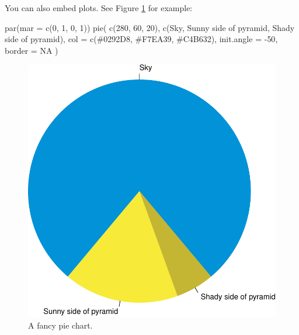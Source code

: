 \documentclass[
]{book}
\newenvironment{Shaded}{\begin{snugshade}}{\end{snugshade}}
\newcommand{\AttributeTok}[1]{\textcolor[rgb]{0.77,0.63,0.00}{#1}}
\newcommand{\ConstantTok}[1]{\textcolor[rgb]{0.00,0.00,0.00}{#1}}
\newcommand{\DecValTok}[1]{\textcolor[rgb]{0.00,0.00,0.81}{#1}}
\newcommand{\FunctionTok}[1]{\textcolor[rgb]{0.00,0.00,0.00}{#1}}
\newcommand{\NormalTok}[1]{#1}
\newcommand{\SpecialCharTok}[1]{\textcolor[rgb]{0.00,0.00,0.00}{#1}}
\newcommand{\StringTok}[1]{\textcolor[rgb]{0.31,0.60,0.02}{#1}}
\begin{document}
You can also embed plots. See Figure \ref{fig:pie} for example:

\begin{Shaded}
\begin{Highlighting}[]
\FunctionTok{par}\NormalTok{(}\AttributeTok{mar =} \FunctionTok{c}\NormalTok{(}\DecValTok{0}\NormalTok{, }\DecValTok{1}\NormalTok{, }\DecValTok{0}\NormalTok{, }\DecValTok{1}\NormalTok{))}
\FunctionTok{pie}\NormalTok{(}
  \FunctionTok{c}\NormalTok{(}\DecValTok{280}\NormalTok{, }\DecValTok{60}\NormalTok{, }\DecValTok{20}\NormalTok{),}
  \FunctionTok{c}\NormalTok{(}\StringTok{\textquotesingle{}Sky\textquotesingle{}}\NormalTok{, }\StringTok{\textquotesingle{}Sunny side of pyramid\textquotesingle{}}\NormalTok{, }\StringTok{\textquotesingle{}Shady side of pyramid\textquotesingle{}}\NormalTok{),}
  \AttributeTok{col =} \FunctionTok{c}\NormalTok{(}\StringTok{\textquotesingle{}\#0292D8\textquotesingle{}}\NormalTok{, }\StringTok{\textquotesingle{}\#F7EA39\textquotesingle{}}\NormalTok{, }\StringTok{\textquotesingle{}\#C4B632\textquotesingle{}}\NormalTok{),}
  \AttributeTok{init.angle =} \SpecialCharTok{{-}}\DecValTok{50}\NormalTok{, }\AttributeTok{border =} \ConstantTok{NA}
\NormalTok{)}
\end{Highlighting}
\end{Shaded}

\begin{figure}
\includegraphics[width=1\linewidth]{Rmarkdown_files/figure-latex/pie-1} \caption{A fancy pie chart.}\label{fig:pie}
\end{figure}
\end{document}
